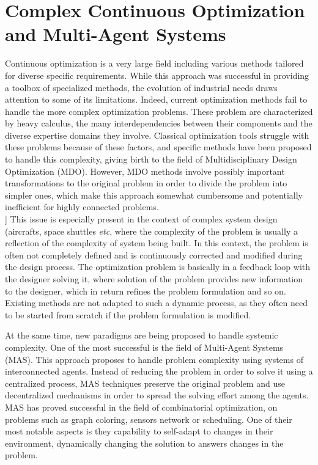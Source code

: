  \label{introduction}

\section*{Complex Continuous Optimization and Multi-Agent Systems}

Continuous optimization is a very large field including various methods tailored for diverse specific requirements. While this approach was successful in providing a toolbox of specialized methods, the evolution of industrial needs draws attention to some of its limitations. Indeed, current optimization methods fail to handle the more complex optimization problems. These problem are characterized by heavy calculus, the many interdependencies between their components and the diverse expertise domains they involve. Classical optimization tools struggle with these problems because of these factors, and specific methods have been proposed to handle this complexity, giving birth to the field of Multidisciplinary Design Optimization (MDO). However, MDO methods involve possibly important transformations to the original problem in order to divide the problem into simpler ones, which make this approach somewhat cumbersome and potentially inefficient for highly connected problems.\\
[[REFORMULER]] This issue is especially present in the context of complex system design (aircrafts, space shuttles \emph{etc}, where the complexity of the problem is usually a reflection of the complexity of system being built. In this context, the problem is often not completely defined and is continuously corrected and modified during the design process. The optimization problem is basically in a feedback loop with the designer solving it, where solution of the problem provides new information to the designer, which in return refines the problem formulation and so on. Existing methods are not adapted to such a dynamic process, as they often need to be started from scratch if the problem formulation is modified.

At the same time, new paradigms are being proposed to handle systemic complexity. One of the most successful is the field of Multi-Agent Systems (MAS). This approach proposes to handle problem complexity using systems of interconnected agents. Instead of reducing the problem in order to solve it using a centralized process, MAS techniques preserve the original problem and use decentralized mechanisms in order to spread the solving effort among the agents. MAS has proved successful in the field of combinatorial optimization, on problems such as graph coloring, sensors network or scheduling. One of their most notable aspects is they capability to self-adapt to changes in their environment, dynamically changing the solution to answers changes in the problem.

